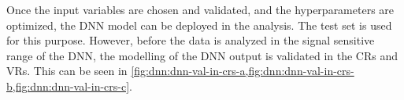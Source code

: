 Once the input variables are chosen and validated, and the hyperparameters are optimized, the DNN model can be deployed in the analysis. The test set is used for this purpose.
However, before the data is analyzed in the signal sensitive range of the DNN, the modelling of the DNN output is validated in the CRs and VRs. This can be seen in \cref{fig:dnn:dnn-val-in-crs-a,fig:dnn:dnn-val-in-crs-b,fig:dnn:dnn-val-in-crs-c}.
\begin{figure}[ht]
    \centering
\end{figure}
